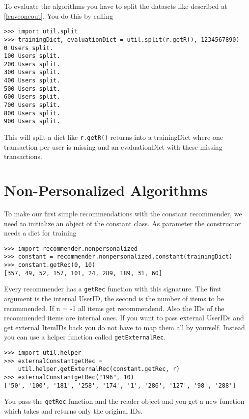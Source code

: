 To evaluate the algorithms you have to split the datasets like described at \ref{leaveoneout}.
You do this by calling
\begin{lstlisting}[style=python]
>>> import util.split
>>> trainingDict, evaluationDict = util.split(r.getR(), 1234567890)
0 Users split.
100 Users split.
200 Users split.
300 Users split.
400 Users split.
500 Users split.
600 Users split.
700 Users split.
800 Users split.
900 Users split.
\end{lstlisting}
This will split a dict like \lstinline!r.getR()! returns into a trainingDict where one transaction
per user is missing and an evaluationDict with these missing transactions.


\section{Non-Personalized Algorithms}
To make our first simple recommendations with the constant recommender,
we need to initialize an object of the constant class.
As parameter the constructor needs a dict for training
\begin{lstlisting}[style=python]
>>> import recommender.nonpersonalized
>>> constant = recommender.nonpersonalized.constant(trainingDict)
>>> constant.getRec(0, 10)
[357, 49, 52, 157, 101, 24, 289, 189, 31, 60]
\end{lstlisting}
Every recommender has a \lstinline!getRec! function with this signature. The first argument is the internal
UserID, the second is the number of items to be recommended. If n = -1 all items get recommendend.
Also the IDs of the recommended items are internal ones.
If you want to pass external UserIDs and get external ItemIDs back you do not have
to map them all by yourself. Instead you can use a helper function called
\lstinline!getExternalRec!.
\begin{lstlisting}[style=python]
>>> import util.helper
>>> externalConstantgetRec = 
    util.helper.getExternalRec(constant.getRec, r)
>>> externalConstantgetRec("196", 10)
['50', '100', '181', '258', '174', '1', '286', '127', '98', '288']
\end{lstlisting}
You pass the \lstinline!getRec! function and the reader object and you get a new function
which takes and returns only the original IDs.

